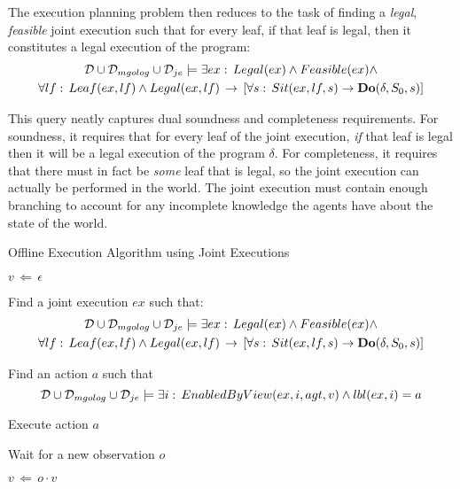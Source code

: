 The execution planning problem then reduces to the task of finding
a \emph{legal}, \emph{feasible} joint execution such that for every
leaf, if that leaf is legal, then it constitutes a legal execution
of the program:\begin{multline}
\mathcal{D}\cup\mathcal{D}_{mgolog}\cup\mathcal{D}_{je}\models\exists ex:\, Legal(ex)\wedge Feasible(ex)\wedge\\
\forall lf:\, Leaf(ex,lf)\wedge Legal(ex,lf)\,\rightarrow\,\left[\forall s:\, Sit(ex,lf,s)\rightarrow\mathbf{Do}(\delta,S_{0},s)\right]\label{eq:JE-Plan-Defn}\end{multline}


This query neatly captures dual soundness and completeness requirements.
For soundness, it requires that for every leaf of the joint execution,
\emph{if} that leaf is legal then it will be a legal execution of
the program $\delta$. For completeness, it requires that there must
in fact be \emph{some} leaf that is legal, so the joint execution
can actually be performed in the world. The joint execution must contain
enough branching to account for any incomplete knowledge the agents
have about the state of the world.

%
\begin{algorithm}[t]
\caption{Offline Execution Algorithm using Joint Executions}


\label{alg:je_offline_exec} \begin{algorithmic}

\STATE

\STATE $v\,\Leftarrow\,\epsilon$

\STATE Find a joint execution $ex$ such that:\begin{multline*}
\mathcal{D}\cup\mathcal{D}_{mgolog}\cup\mathcal{D}_{je}\models\exists ex:\, Legal(ex)\wedge Feasible(ex)\wedge\\
\forall lf:\, Leaf(ex,lf)\wedge Legal(ex,lf)\,\rightarrow\,\left[\forall s:\, Sit(ex,lf,s)\rightarrow\mathbf{Do}(\delta,S_{0},s)\right]\end{multline*}



\STATE Find an action $a$ such that\[
\mathcal{D}\cup\mathcal{D}_{mgolog}\cup\mathcal{D}_{je}\models\exists i:\, EnabledByView(ex,i,agt,v)\wedge lbl(ex,i)=a\]



\STATE Execute action $a$

\ENDIF

\STATE Wait for a new observation $o$

\STATE $v\,\Leftarrow\, o\cdot v$

\ENDWHILE

\end{algorithmic} 
\end{algorithm}


